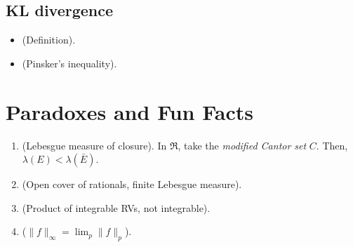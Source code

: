 \documentclass[a4paper,10pt]{article}
\begin{document}
\subsection{KL divergence}
\begin{itemize}
 \item (Definition).
 \item (Pinsker's inequality).
\end{itemize}


\section{Paradoxes and Fun Facts}
\begin{enumerate}
 \item (Lebesgue measure of closure). In $\Re$, take the \textit{modified Cantor set} $C$. Then, $\lambda(E) < \lambda(\bar{E})$. 
 \item (Open cover of rationals, finite Lebesgue measure).
 \item (Product of integrable RVs, not integrable).
 \item ($\|f\|_\infty = \lim_p \|f\|_p$).
\end{enumerate}
\end{document}
